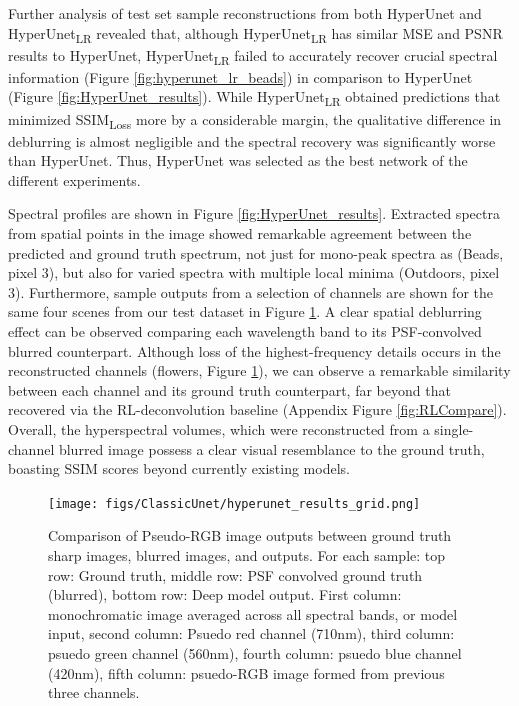 \documentclass{article}
\begin{document}
Further analysis of test set sample reconstructions from both HyperUnet and HyperUnet\textsubscript{LR} revealed that, although HyperUnet\textsubscript{LR} has similar MSE and PSNR results to HyperUnet, HyperUnet\textsubscript{LR} failed to accurately recover crucial spectral information (Figure \ref{fig:hyperunet_lr_beads}) in comparison to HyperUnet (Figure \ref{fig:HyperUnet_results}). While HyperUnet\textsubscript{LR} obtained predictions that minimized SSIM\textsubscript{Loss} more by a considerable margin, the qualitative difference in deblurring is almost negligible and the spectral recovery was significantly worse than HyperUnet. Thus, HyperUnet was selected as the best network of the different experiments.

Spectral profiles are shown in Figure \ref{fig:HyperUnet_results}. Extracted spectra from spatial points in the image showed remarkable agreement between the predicted and ground truth spectrum, not just for mono-peak spectra as (Beads, pixel 3), but also for varied spectra with multiple local minima (Outdoors, pixel 3). Furthermore, sample outputs from a selection of channels are shown for the same four scenes from our test dataset in Figure \ref{fig:HyperUnet_results_grid}. A clear spatial deblurring effect can be observed comparing each wavelength band to its PSF-convolved blurred counterpart. Although loss of the highest-frequency details occurs in the reconstructed channels (flowers, Figure \ref{fig:HyperUnet_results_grid}), we can observe a remarkable similarity between each channel and its ground truth counterpart, far beyond that recovered via the RL-deconvolution baseline (Appendix Figure \ref{fig:RLCompare}). Overall, the hyperspectral volumes, which were reconstructed from a single-channel blurred image possess a clear visual resemblance to the ground truth, boasting SSIM scores beyond currently existing models.

\begin{figure}
\centering
\texttt{[image: figs/ClassicUnet/hyperunet\_results\_grid.png]}
    \caption{Comparison of Pseudo-RGB image outputs between ground truth sharp images, blurred images, and  outputs. For each sample: top row: Ground truth, middle row: PSF convolved ground truth (blurred), bottom row: Deep model output. First column: monochromatic image averaged across all spectral bands, or model input, second column: Psuedo red channel (710nm), third column: psuedo green channel (560nm), fourth column: psuedo blue channel (420nm), fifth column: psuedo-RGB image formed from previous three channels. }
    \label{fig:HyperUnet_results_grid}
\end{figure}
\end{document}
